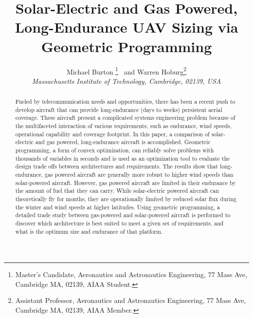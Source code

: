 \title{Solar-Electric and Gas Powered, Long-Endurance UAV Sizing via Geometric Programming}

 \author{
  Michael Burton \thanks{Master's Candidate, Aeronautics and Astronautics Engineering, 77 Mass Ave, Cambridge MA, 02139, AIAA Student.}
  \ and Warren Hoburg\thanks{Assistant Professor, Aeronautics and Astronautics Engineering, 77 Mass Ave, Cambridge MA, 02139, AIAA Member.}\\
  {\normalsize\itshape
   Massachusetts Institute of Technology, Cambridge, 02139, USA}\\
 }


 \newcommand{\eqnref}[1]{(\ref{#1})}
 \newcommand{\class}[1]{\texttt{#1}}
 \newcommand{\package}[1]{\texttt{#1}}
 \newcommand{\file}[1]{\texttt{#1}}
 \newcommand{\BibTeX}{\textsc{Bib}\TeX}
 \usepackage{hyperref}
 \hypersetup{citecolor = blue}



\graphicspath{{./figs/}} 
\maketitle

\begin{abstract}
    Fueled by telecommunication needs and opportunities, there has been a recent push to develop aircraft that can provide long-endurance (days to weeks) persistent aerial coverage.
    These aircraft present a complicated systems engineering problem because of the multifaceted interaction of various requirements, such as endurance, wind speeds, operational capability and coverage footprint.
    In this paper, a comparison of solar-electric and gas powered, long-endurance aircraft is accomplished.
    Geometric programming, a form of convex optimization, can reliably solve problems with thousands of variables in seconds and is used as an optimization tool to evaluate the design trade offs between architectures and requirements.
    The results show that long-endurance, gas powered aircraft are generally more robust to higher wind speeds than solar-powered aircraft.  
    However, gas powered aircraft are limited in their endurance by the amount of fuel that they can carry. 
    While solar-electric powered aircraft can theoretically fly for months, they are operationally limited by reduced solar flux during the winter and wind speeds at higher latitudes.
    Using geometric programming, a detailed trade study between gas-powered and solar-powered aircraft is performed to discover which architecture is best suited to meet a given set of requirements, and what is the optimum size and endurance of that platform.
\end{abstract}

